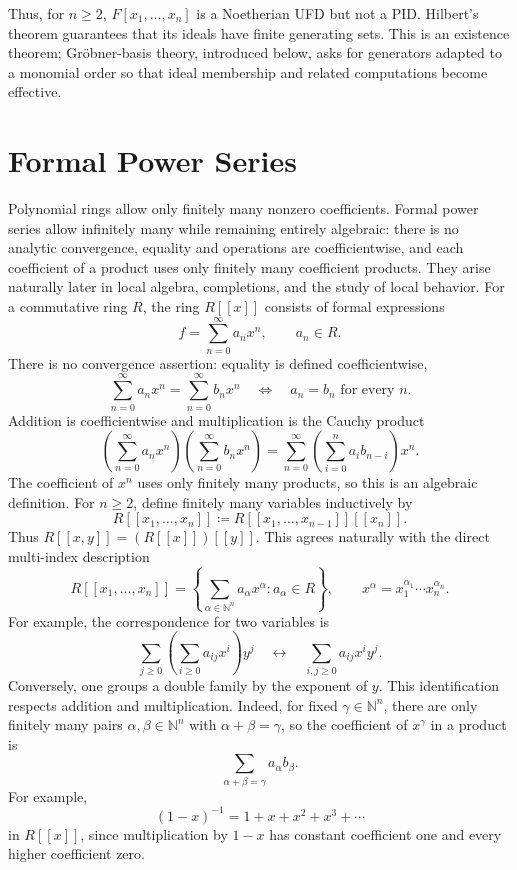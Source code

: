Thus, for \(n\ge2\), \(F[x_1,\ldots,x_n]\) is a Noetherian UFD but not a
PID.  Hilbert's theorem guarantees that its ideals have finite generating
sets.  This is an existence theorem; Gr\"obner-basis theory, introduced
below, asks for generators adapted to a monomial order so that ideal
membership and related computations become effective.

\section{Formal Power Series}
Polynomial rings allow only finitely many nonzero coefficients.  Formal power
series allow infinitely many while remaining entirely algebraic: there is no
analytic convergence, equality and operations are coefficientwise, and each
coefficient of a product uses only finitely many coefficient products.  They
arise naturally later in local algebra, completions, and the study of local
behavior.
For a commutative ring \(R\), the ring \(R[[x]]\) consists of formal
expressions
\[f=\sum_{n=0}^\infty a_nx^n,\qquad a_n\in R.\]
There is no convergence assertion: equality is defined coefficientwise,
\[
\sum_{n=0}^\infty a_nx^n=\sum_{n=0}^\infty b_nx^n
\quad\Longleftrightarrow\quad a_n=b_n\text{ for every }n.
\]
Addition is coefficientwise and multiplication is the Cauchy product
\[
\left(\sum_{n=0}^\infty a_nx^n\right)
\left(\sum_{n=0}^\infty b_nx^n\right)
=\sum_{n=0}^\infty\left(\sum_{i=0}^n a_ib_{n-i}\right)x^n.
\]
The coefficient of \(x^n\) uses only finitely many products, so this is an
algebraic definition.  For \(n\ge2\), define finitely many variables
inductively by
\[
R[[x_1,\ldots,x_n]]\coloneqq R[[x_1,\ldots,x_{n-1}]][[x_n]].
\]
Thus \(R[[x,y]]=(R[[x]])[[y]]\).  This agrees naturally with the direct
multi-index description
\[
R[[x_1,\ldots,x_n]]=
\left\{\sum_{\alpha\in\mathbb N^n}a_\alpha x^\alpha:a_\alpha\in R\right\},
\qquad x^\alpha=x_1^{\alpha_1}\cdots x_n^{\alpha_n}.
\]
For example, the correspondence for two variables is
\[
\sum_{j\ge0}\left(\sum_{i\ge0}a_{ij}x^i\right)y^j
\quad\longleftrightarrow\quad
\sum_{i,j\ge0}a_{ij}x^iy^j.
\]
Conversely, one groups a double family by the exponent of \(y\).  This
identification respects addition and multiplication.  Indeed, for fixed
\(\gamma\in\mathbb N^n\), there are only
finitely many pairs \(\alpha,\beta\in\mathbb N^n\) with
\(\alpha+\beta=\gamma\), so the coefficient of \(x^\gamma\) in a product is
\[\sum_{\alpha+\beta=\gamma}a_\alpha b_\beta.\]
For example,
\[(1-x)^{-1}=1+x+x^2+x^3+\cdots\]
in \(R[[x]]\), since multiplication by \(1-x\) has constant coefficient
one and every higher coefficient zero.

